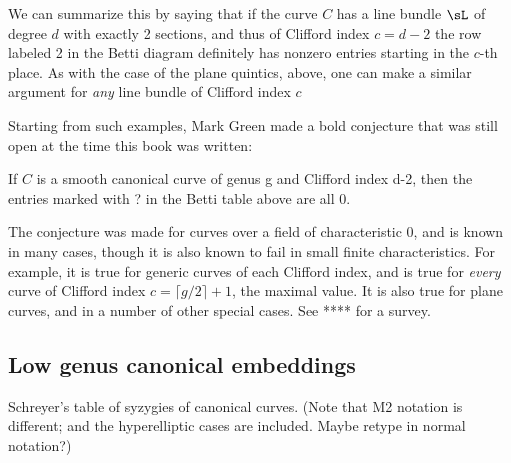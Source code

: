 We can summarize this by saying
that if the curve $C$ has a line bundle $\sL$ of degree $d$ with exactly 2 sections, and thus of Clifford index $c = d-2$ the row labeled  2 
in the Betti diagram definitely has nonzero entries starting in the $c$-th place. As with the case of the plane quintics, above, one can
make a similar argument for \emph{any} line bundle of Clifford index $c$

Starting from such examples, Mark Green made a bold conjecture that was still open at the time this book was written:

\begin{conjecture}
If $C$ is a smooth canonical curve of genus g and Clifford index d-2, then the entries marked with ? in the Betti table above are all 0. 
\end{conjecture}

The conjecture was made for curves over a field of characteristic 0, and is known in many cases, though it is also known to fail in small finite characteristics.
For example, it is true for generic curves of each Clifford index, and is true for \emph{every} curve of  Clifford index $c = \lceil g/2\rceil+1$, the maximal value.
It is also true for plane curves, and in a number of other special cases. See **** for a survey.

\subsection{Low genus canonical embeddings} Schreyer's table of syzygies of canonical curves. (Note that M2 notation is
different; and the hyperelliptic cases are included. Maybe retype in normal notation?)



